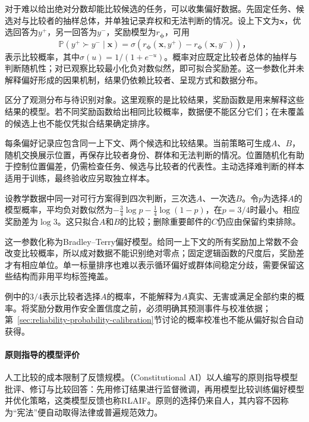 对于难以给出绝对分数却能比较候选的任务，可以收集偏好数据。先固定任务、候选对与比较者的抽样总体，并单独记录弃权和无法判断的情况。设上下文为$\bm{x}$，优选回答为$y^+$，另一回答为$y^-$，奖励模型为$r_{\bm\phi}$，可用
\[
 \mathbb P(y^+\succ y^-\mid\bm{x})
 =\sigma\!\left(r_{\bm{\phi}}(\bm{x},y^+)
              -r_{\bm{\phi}}(\bm{x},y^-)\right)\text{，}
\]
表示比较概率，其中$\sigma(u)=1/(1+e^{-u})$。概率对应既定比较者总体的抽样与判断随机性；对已观察比较最小化负对数似然，即可拟合奖励差。这一参数化并未解释偏好形成的因果机制，结果仍依赖比较者、呈现方式和数据分布。

区分了观测分布与待识别对象。这里观察的是比较结果，奖励函数是用来解释这些结果的模型。若不同奖励函数给出相同比较概率，数据便不能区分它们；在未覆盖的候选上也不能仅凭拟合结果确定排序。

每条偏好记录应包含同一上下文、两个候选和比较结果。当前策略可生成$A$、$B$，随机交换展示位置，再保存比较者身份、群体和无法判断的情况。位置随机化有助于控制位置偏差，仍需检查任务、候选与比较者的代表性。主动选择难判断的样本适用于训练，最终验收应另取独立样本。

设教学数据中同一对可行方案得到四次判断，三次选$A$、一次选$B$。令$p$为选择$A$的模型概率，平均负对数似然为$-\tfrac34\log p-\tfrac14\log(1-p)$，在$p=3/4$时最小。相应奖励差为$\log3$。这只拟合$A$和$B$的比较；删除重要邮件的$C$仍应由保留约束排除。

这一参数化称为Bradley--Terry偏好模型。给同一上下文的所有奖励加上常数不会改变比较概率，所以成对数据不能识别绝对零点；固定逻辑函数的尺度后，奖励差才有相应单位。单一标量排序也难以表示循环偏好或群体间稳定分歧，需要保留这些结构而非用平均标签掩盖。

例中的$3/4$表示比较者选择$A$的概率，不能解释为$A$真实、无害或满足全部约束的概率。将奖励分数用作安全置信度之前，必须明确其预测事件与校准依据；第~\ref{sec:reliability-probability-calibration}节讨论的概率校准也不能从偏好拟合自动获得。

\paragraph{原则指导的模型评价}

人工比较的成本限制了反馈规模。（Constitutional AI）以人编写的原则指导模型批评、修订与比较回答：先用修订结果进行监督微调，再用模型比较训练偏好模型并优化策略，这类模型反馈也称RLAIF。原则的选择仍来自人，其内容不因称为“宪法”便自动取得法律或普遍规范效力。

